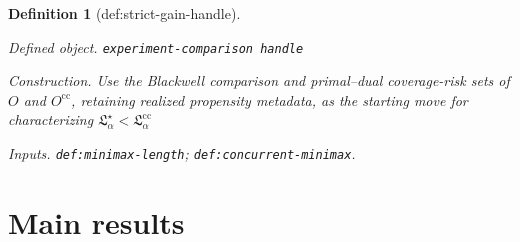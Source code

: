 \documentclass{article}
\newtheorem{definition}{Definition}
\begin{document}
\begin{definition}[def:strict-gain-handle]\label{def:strict-gain-handle}
\par\smallskip\noindent\emph{Defined object.} \texttt{experiment-\allowbreak{}comparison handle}
\par\smallskip\noindent\emph{Construction.} Use the Blackwell comparison and primal--dual coverage-risk sets of \(O\) and \(O^{\mathrm{cc}}\), retaining realized propensity metadata, as the starting move for characterizing \(\mathfrak L_\alpha^\star<\mathfrak L_\alpha^{\mathrm{cc}}\)
\par\smallskip\noindent\emph{Inputs.} \texttt{def:\allowbreak{}minimax-\allowbreak{}length}; \texttt{def:\allowbreak{}concurrent-\allowbreak{}minimax}.
\end{definition}

\section{Main results}
\end{document}
